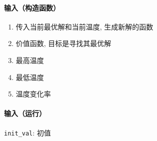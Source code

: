 \paragraph{输入（构造函数）}

\begin{enumerate}
    \item[\verb|gen|] 传入当前最优解和当前温度, 生成新解的函数
    \item[\verb|f|] 价值函数, 目标是寻找其最优解
    \item[\verb|Tmax|] 最高温度
    \item[\verb|Tmin|] 最低温度
    \item[\verb|dT|] 温度变化率
\end{enumerate}

\paragraph{输入（运行）}

\verb|init_val|: 初值
